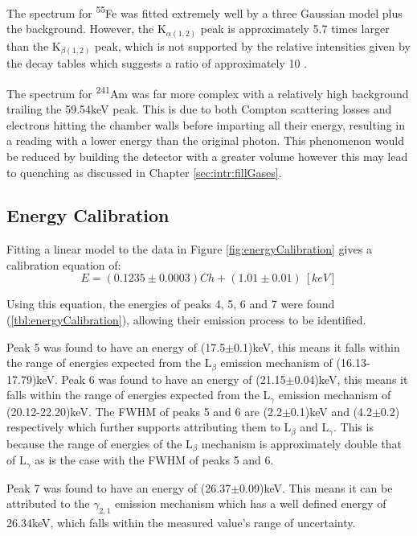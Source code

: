 The spectrum for \textsuperscript{55}Fe was fitted extremely well by a three Gaussian model plus the background. However, the K$_{\alpha(1,2)}$ peak is approximately 5.7 times larger than the K$_{\beta(1,2)}$ peak, which is not supported by the relative intensities given by the decay tables which suggests a ratio of approximately 10 \cite{decay_modes}.

The spectrum for \textsuperscript{241}Am was far more complex with a relatively high background trailing the 59.54keV peak. This is due to both Compton scattering losses and electrons hitting the chamber walls before imparting all their energy, resulting in a reading with a lower energy than the original photon. This phenomenon would be reduced by building the detector with a greater volume however this may lead to quenching as discussed in Chapter \ref{sec:intr:fillGases}.

\subsection{Energy Calibration}

Fitting a linear model to the data in Figure \ref{fig:energyCalibration} gives a calibration equation of:
\begin{equation}
    E = (0.1235\pm0.0003)Ch + (1.01\pm0.01) \  [keV]
\end{equation}

Using this equation, the energies of peaks 4, 5, 6 and 7 were found (\ref{tbl:energyCalibration}), allowing their emission process to be identified.

Peak 5 was found to have an energy of (17.5$\pm$0.1)keV, this means it falls within the range of energies expected from the L$_{\beta}$ emission mechanism of (16.13-17.79)keV. Peak 6 was found to have an energy of (21.15$\pm$0.04)keV, this means it falls within the range of energies expected from the L$_{\gamma}$ emission mechanism of (20.12-22.20)keV. The FWHM of peaks 5 and 6 are (2.2$\pm$0.1)keV and (4.2$\pm$0.2) respectively which further supports attributing them to L$_{\beta}$ and L$_{\gamma}$. This is because the range of energies of the L$_{\beta}$ mechanism is approximately double that of L$_{\gamma}$ as is the case with the FWHM of peaks 5 and 6.

Peak 7 was found to have an energy of (26.37$\pm$0.09)keV. This means it can be attributed to the $\gamma_{2,1}$ emission mechanism which has a well defined energy of 26.34keV, which falls within the measured value's range of uncertainty.

